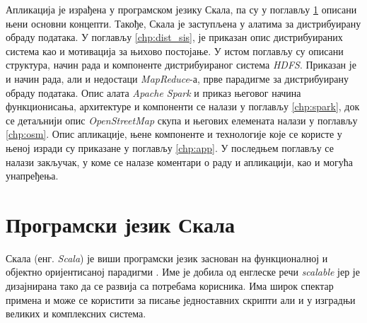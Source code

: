 \documentclass[12pt,oneside]{memoir}
\begin{document}
Апликација је израђена у програмском језику Скала, па су у поглављу \ref{chp:scala} описани њени основни концепти. Такође, Скала је заступљена у алатима за дистрибуирану обраду података. У поглављу \ref{chp:dist_sis}, је приказан опис дистрибуираних система као и мотивација за њихово постојање. У истом поглављу су описани структура, начин рада и компоненте дистрибуираног система \textit{HDFS}. Приказан је и начин рада, али и недостаци \textit{MapReduce}-а, прве парадигме за дистрибуирану обраду података. Опис алата \textit{Apache Spark} и приказ његовог начина функционисања, архитектуре и компоненти се налази у поглављу \ref{chp:spark}, док се детаљнији опис \textit{OpenStreetMap} скупа и његових елемената налази у поглављу \ref{chp:osm}. Опис апликације, њене компоненте и технологије које се користе у њеној изради су приказане у поглављу \ref{chp:app}. У последњем поглављу се налази закључак, у коме се налазе коментари о раду и апликацији, као и могућа унапређења.

%
%

\chapter{Програмски језик Скала}
\label{chp:scala}

Скала (енг. \textit{Scala}) је виши програмски језик заснован на функционалној и објектно оријентисаној парадигми  \cite{scala_prog}. Име је добила од енглеске речи \textit{scalable} јер је дизајнирана тако да се развија са потребама корисника. Има широк спектар примена и може се користити за писање једноставних скрипти али и у изградњи великих и комплексних система.
\end{document}
